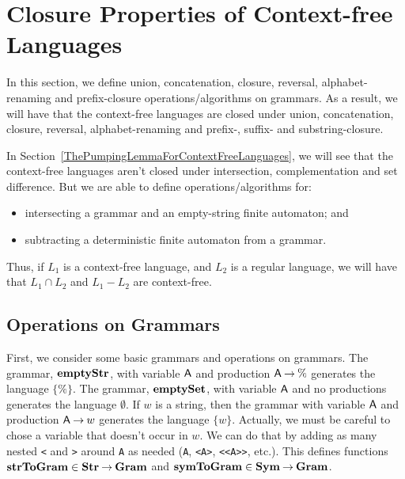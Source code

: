 \section{Closure Properties of Context-free Languages}
\label{ClosurePropertiesOfContextFreeLanguages}

%
In this section, we define union, concatenation, closure, reversal,
alphabet-renaming and prefix-closure operations/algorithms on
grammars.  As a result, we will have that the context-free languages
are closed under union, concatenation, closure, reversal,
alphabet-renaming and prefix-, suffix- and substring-closure.

In Section~\ref{ThePumpingLemmaForContextFreeLanguages}, we
will see that the context-free languages aren't closed under
intersection, complementation and set difference.
But we are able to define operations/algorithms for:
\begin{itemize}
\item intersecting a grammar and an empty-string finite automaton; and

\item subtracting a deterministic finite automaton from a grammar.
\end{itemize}
Thus, if $L_1$ is a context-free language, and $L_2$ is a regular
language, we will have that $L_1\cap L_2$ and $L_1-L_2$ are
context-free.

\subsection{Operations on Grammars}

First, we consider some basic grammars and operations on grammars.
The grammar, $\mathbf{emptyStr}$, with variable $\mathsf{A}$ and production
$\mathsf{A}\mathbin{\to}\%$ generates the language $\{\%\}$.  The grammar,
$\mathbf{emptySet}$, with variable $\mathsf{A}$ and no productions generates the
language $\emptyset$.  If $w$ is a string, then the grammar with
variable $\mathsf{A}$ and production $\mathsf{A}\mathbin{\to} w$ generates the language
$\{w\}$.  Actually, we must be careful to chose a variable that
doesn't occur in $w$. We can do that by adding as many nested
\texttt{<} and \texttt{>} around \texttt{A} as needed (\texttt{A},
\texttt{<A>}, \texttt{<<A>>}, etc.). This defines functions
$\mathbf{strToGram}\in\mathbf{Str}\mathbin{\to}\mathbf{Gram}$ and $\mathbf{symToGram}\in\mathbf{Sym}\mathbin{\to}\mathbf{Gram}$.

